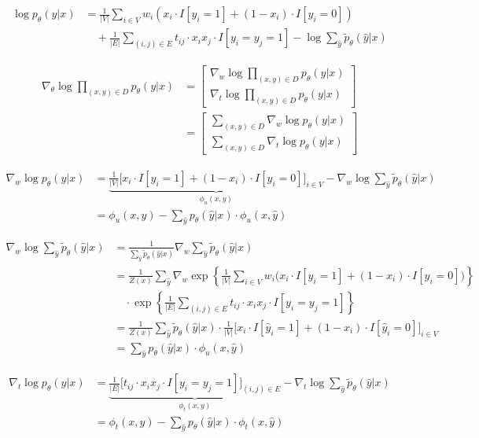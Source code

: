 \documentclass[11pt,a4paper]{article}
\begin{document}
\begin{align*}
\log p_\theta(y|x)&=\frac{1}{|V|}\sum_{i\in V}w_i(x_i\cdot I[y_i=1]+(1-x_i)\cdot I[y_i=0])\\
&\quad+\frac{1}{|E|}\sum_{(i,j)\in E}t_{ij}\cdot x_ix_j\cdot I[y_i=y_j=1]-\log\sum_{\hat{y}}\tilde{p}_\theta(\hat{y}|x)
\end{align*}

\begin{align*}
\nabla_\theta\log\prod_{(x,y)\in D}p_\theta(y|x)&=\begin{bmatrix}
\nabla_w\log\prod_{(x,y)\in D}p_\theta(y|x)\\ 
\nabla_t\log\prod_{(x,y)\in D}p_\theta(y|x)
\end{bmatrix}\\
&=\begin{bmatrix}
\sum_{(x,y)\in D}\nabla_w\log p_\theta(y|x)\\ 
\sum_{(x,y)\in D}\nabla_t\log p_\theta(y|x)
\end{bmatrix}
\end{align*}

\begin{align*}
\nabla_w\log p_\theta(y|x)&=\underbrace{\frac{1}{|V|}\Big[x_i\cdot I[y_i=1]+(1-x_i)\cdot I[y_i=0]\Big]_{i\in V}}_{\phi_u(x,y)}-\nabla_w\log\sum_{\hat{y}}\tilde{p}_\theta(\hat{y}|x)\\
&=\phi_u(x,y)-\sum_{\hat{y}}p_\theta(\hat{y}|x)\cdot\phi_u(x,\hat{y})
\end{align*}

\begin{align*}
\nabla_w\log\sum_{\hat{y}}\tilde{p}_\theta(\hat{y}|x)&=\frac{1}{\sum_{\hat{y}}\tilde{p}_\theta(\hat{y}|x)}\nabla_w\sum_{\hat{y}}\tilde{p}_\theta(\hat{y}|x)\\
&=\frac{1}{Z(x)}\sum_{\hat{y}}\nabla_w\exp\left\{\frac{1}{|V|}\sum_{i\in V}w_i\big(x_i\cdot I[y_i=1]+(1-x_i)\cdot I[y_i=0]\big)\right\}\\
&\quad\cdot\exp\left\{\frac{1}{|E|}\sum_{(i,j)\in E}t_{ij}\cdot x_ix_j\cdot I[y_i=y_j=1]\right\}\\
&=\frac{1}{Z(x)}\sum_{\hat{y}}\tilde{p}_\theta(\hat{y}|x)\cdot\frac{1}{|V|}\Big[x_i\cdot I[\hat{y}_i=1]+(1-x_i)\cdot I[\hat{y}_i=0]\Big]_{i\in V}\\
&=\sum_{\hat{y}}p_\theta(\hat{y}|x)\cdot\phi_u(x,\hat{y})
\end{align*}

\begin{align*}
\nabla_t\log p_\theta(y|x)&=\underbrace{\frac{1}{|E|}\Big[t_{ij}\cdot x_ix_j\cdot I[y_i=y_j=1]\Big]_{(i,j)\in E}}_{\phi_t(x,y)}-\nabla_t\log\sum_{\hat{y}}\tilde{p}_\theta(\hat{y}|x)\\
&=\phi_t(x,y)-\sum_{\hat{y}}p_\theta(\hat{y}|x)\cdot\phi_t(x,\hat{y})
\end{align*}
\end{document}

